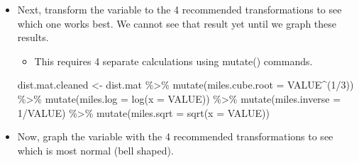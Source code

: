 \documentclass[
  letterpaper,
  DIV=11,
  numbers=noendperiod]{scrreprt}
\newenvironment{Shaded}{\begin{snugshade}}{\end{snugshade}}
\newcommand{\AttributeTok}[1]{\textcolor[rgb]{0.40,0.45,0.13}{#1}}
\newcommand{\DecValTok}[1]{\textcolor[rgb]{0.68,0.00,0.00}{#1}}
\newcommand{\FunctionTok}[1]{\textcolor[rgb]{0.28,0.35,0.67}{#1}}
\newcommand{\NormalTok}[1]{\textcolor[rgb]{0.00,0.23,0.31}{#1}}
\newcommand{\OtherTok}[1]{\textcolor[rgb]{0.00,0.23,0.31}{#1}}
\newcommand{\SpecialCharTok}[1]{\textcolor[rgb]{0.37,0.37,0.37}{#1}}
\providecommand{\tightlist}{%
  \setlength{\itemsep}{0pt}\setlength{\parskip}{0pt}}\usepackage{longtable,booktabs,array}
\begin{document}
\begin{itemize}
\item
  Next, transform the variable to the 4 recommended transformations to
  see which one works best. We cannot see that result yet until we graph
  these results.

  \begin{itemize}
  \tightlist
  \item
    This requires 4 separate calculations using mutate() commands.
  \end{itemize}

\begin{Shaded}
\begin{Highlighting}[]
\NormalTok{dist.mat.cleaned }\OtherTok{\textless{}{-}}\NormalTok{ dist.mat }\SpecialCharTok{\%\textgreater{}\%}
    \FunctionTok{mutate}\NormalTok{(}\AttributeTok{miles.cube.root =}\NormalTok{ VALUE}\SpecialCharTok{\^{}}\NormalTok{(}\DecValTok{1}\SpecialCharTok{/}\DecValTok{3}\NormalTok{)) }\SpecialCharTok{\%\textgreater{}\%}
    \FunctionTok{mutate}\NormalTok{(}\AttributeTok{miles.log =} \FunctionTok{log}\NormalTok{(}\AttributeTok{x =}\NormalTok{ VALUE)) }\SpecialCharTok{\%\textgreater{}\%}
    \FunctionTok{mutate}\NormalTok{(}\AttributeTok{miles.inverse =} \DecValTok{1}\SpecialCharTok{/}\NormalTok{VALUE) }\SpecialCharTok{\%\textgreater{}\%}
    \FunctionTok{mutate}\NormalTok{(}\AttributeTok{miles.sqrt =} \FunctionTok{sqrt}\NormalTok{(}\AttributeTok{x =}\NormalTok{ VALUE))}
\end{Highlighting}
\end{Shaded}
\item
  Now, graph the variable with the 4 recommended transformations to see
  which is most normal (bell shaped).
\end{itemize}
\end{document}

